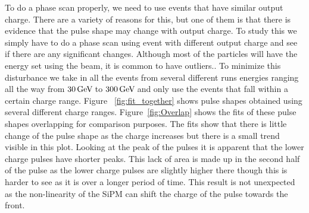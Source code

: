 To do a phase scan properly, we need to use events that have similar output charge. There are a variety of reasons for this, but one of them is that there is evidence that the pulse shape may change with output charge. To study this we simply have to do a phase scan using event with different output charge and see if there are any significant changes. Although most of the particles will have the energy set using the beam, it is common to have outliers.. To minimize this disturbance we take in all the events from several different runs energies ranging all the way from $30 {\,\text{Ge\hspace{-.08em}V\hspace{-0.16em}}}$ to $300 {\,\text{Ge\hspace{-.08em}V\hspace{-0.16em}}}$ and only use the events that fall within a certain charge range. Figure ~\ref{fig:fit_together} shows pulse shapes obtained using several different charge ranges. Figure~\ref{fig:Overlap} shows the fits of these pulse shapes overlapping for comparison purposes. The fits show that there is little change of the pulse shape as the charge increases but there is a small trend visible in this plot. Looking at the peak of the pulses it is apparent that the lower charge pulses have shorter peaks. This lack of area is made up in the second half of the pulse as the lower charge pulses are slightly higher there though this is harder to see as it is over a longer period of time. This result is not unexpected as the non-linearity of the SiPM can shift the charge of the pulse towards the front. 


